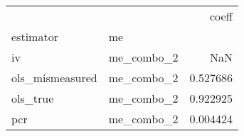 \begin{tabular}{llr}
\toprule
    &            &     coeff \\
estimator & me &           \\
\midrule
iv & me\_combo\_2 &       NaN \\
ols\_mismeasured & me\_combo\_2 &  0.527686 \\
ols\_true & me\_combo\_2 &  0.922925 \\
pcr & me\_combo\_2 &  0.004424 \\
\bottomrule
\end{tabular}
